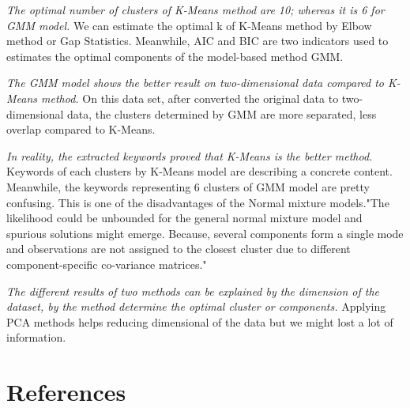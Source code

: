 \documentclass[12pt]{article}
\let\tempone\itemize
\let\temptwo\enditemize
\renewenvironment{itemize}{\tempone\setlength{\itemsep}{0pt}}{\temptwo}
\begin{document}
\begin{itemize}

    \item \textit{The optimal number of clusters of K-Means method are 10; whereas it is 6 for GMM model.} We can estimate the optimal k of K-Means method by Elbow method or Gap Statistics. Meanwhile, AIC and BIC are two indicators used to estimates the optimal components of the model-based method GMM.

    \item \textit{The GMM model shows the better result on two-dimensional data compared to K-Means method.} On this data set, after converted the original data to two-dimensional data, the clusters determined by GMM are more separated, less overlap compared to K-Means.

    \item \textit{In reality, the extracted keywords proved that K-Means is the better method.} Keywords of each clusters by K-Means model are describing a concrete content. Meanwhile, the keywords representing 6 clusters of GMM model are pretty confusing. This is one of the disadvantages of the Normal mixture models."The likelihood could be unbounded for the general normal mixture model and spurious solutions might emerge. Because,  several components form a single mode and observations are not assigned to the closest cluster due to different component-specific co-variance matrices."
    \item \textit{The different results of two methods can be explained by the dimension of the dataset, by the method determine the optimal cluster or components.} Applying PCA methods helps reducing dimensional of the data but we might lost a lot of information.  


\end{itemize}
%
%
\section*{References}
\end{document}
